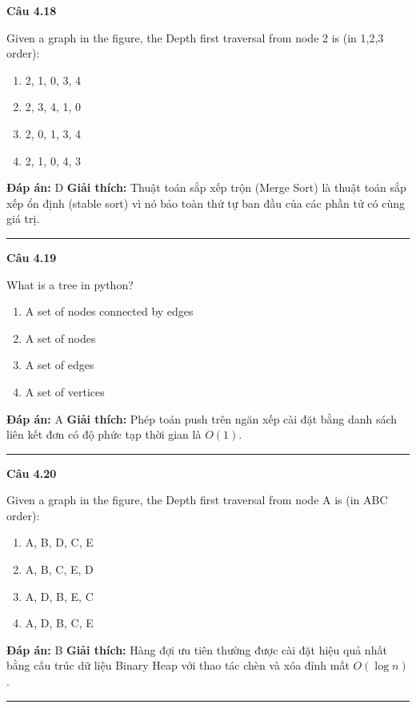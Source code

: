 \documentclass[11pt,a4paper]{article}
\newenvironment{question}[1]{%
  \par\vspace{1em}\noindent\textbf{\large Câu #1}\par\vspace{0.4em}
}{%
  \par\vspace{1em}\hrule\vspace{0.6em}
}
\newenvironment{choices}{%
  \begin{enumerate}[label=\textbf{\Alph*.},leftmargin=2.2em,itemsep=2pt,topsep=3pt]
}{%
  \end{enumerate}
}
\newcommand{\choice}{\item}
\begin{document}
\begin{question}{4.18}
Given a graph in the figure, the Depth first traversal from node 2 is (in 1,2,3 order):
\begin{center}
\end{center}
\begin{choices}
\choice 2, 1, 0, 3, 4
\choice 2, 3, 4, 1, 0
\choice 2, 0, 1, 3, 4
\choice 2, 1, 0, 4, 3
\end{choices}
\textbf{Đáp án:} D
\textbf{Giải thích:} Thuật toán sắp xếp trộn (Merge Sort) là thuật toán sắp xếp ổn định (stable sort) vì nó bảo toàn thứ tự ban đầu của các phần tử có cùng giá trị.
\end{question}

\begin{question}{4.19}
What is a tree in python?
\begin{choices}
\choice A set of nodes connected by edges
\choice A set of nodes
\choice A set of edges
\choice A set of vertices
\end{choices}
\textbf{Đáp án:} A
\textbf{Giải thích:} Phép toán push trên ngăn xếp cài đặt bằng danh sách liên kết đơn có độ phức tạp thời gian là $O(1)$.
\end{question}

\begin{question}{4.20}
Given a graph in the figure, the Depth first traversal from node A is (in ABC order):
\begin{center}
\end{center}
\begin{choices}
\choice A, B, D, C, E
\choice A, B, C, E, D
\choice A, D, B, E, C
\choice A, D, B, C, E
\end{choices}
\textbf{Đáp án:} B
\textbf{Giải thích:} Hàng đợi ưu tiên thường được cài đặt hiệu quả nhất bằng cấu trúc dữ liệu Binary Heap với thao tác chèn và xóa đỉnh mất $O(\log n)$.
\end{question}
\end{document}
